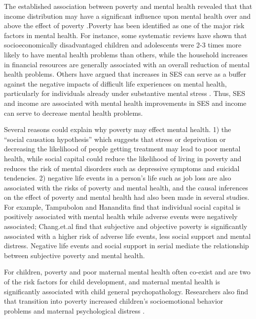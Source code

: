 \documentclass{article}
\begin{document}
The established association between poverty and mental health revealed that that income distribution may have a significant influence upon mental health over and above the effect of poverty \citep{HANANDITA201459}.Poverty has been identified as one of the major risk factors in mental health. For instance, some systematic reviews have shown that socioeconomically disadvantaged children and adolescents were 2-3 times more likely to have mental health problems than others\citep{REISS201324}, while the household increases in financial resources are generally associated with an overall reduction of mental health problems\citep{2015Does}. Others have argued that increases in SES can serve as a buffer against the negative impacts of difficult life experiences on mental health, particularly for individuals already under substantive mental stress \citep{Kawachi2001Sep}. Thus, SES and income are associated with mental health improvements in SES and income can serve to decrease mental health problems.

 
Several reasons could explain why poverty may effect mental health. 1) the “social causation hypothesis” which suggests that stress or deprivation or decreasing the likelihood of people getting treatment may lead to poor mental health\citep{mills2015}, while social capital could reduce the likelihood of living in poverty and reduces the risk of mental disorders such as depressive symptoms and suicidal tendencies\citep{RN1291}. 2) negative life events in a person’s life such as job loss are also associated with the risks of poverty\citep{RN1293} and mental health\citep{TAMPUBOLON201420}, and the causal inferences on the effect of poverty and mental health had also been made in several studies. For example, Tampubolon and Hanandita\citep{TAMPUBOLON201420} find that individual social capital is positively associated with mental health while adverse events were negatively associated; Chang.et.al \citep{RN1291} find that subjective and objective poverty is significantly associated with a higher risk of adverse life events, less social support and mental distress. Negative life events and social support in serial mediate the relationship between subjective poverty and mental health.

For children, poverty and poor maternal mental health often co-exist and are two of the risk factors for child development\citep{LUND20111502}, and maternal mental health is significantly associated with child general psychopathology\citep{ RN1289}. Researchers also find that transition into poverty increased children’s socioemotional behavior problems and maternal psychological distress \citep{WICKHAM2017e141}.
\end{document}
